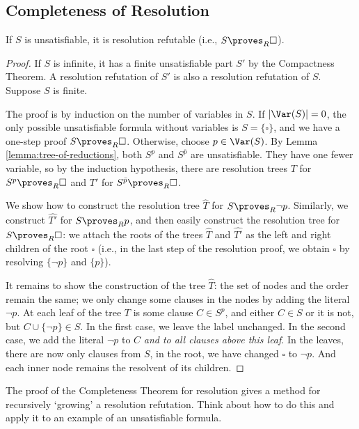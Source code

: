 \subsection{Completeness of Resolution}

\begin{theorem}
If $S$ is unsatisfiable, it is resolution refutable (i.e., $S \proves_R \square$).
\end{theorem}   
\begin{proof}
If $S$ is infinite, it has a finite unsatisfiable part $S'$ by the Compactness Theorem. A resolution refutation of $S'$ is also a resolution refutation of $S$. Suppose $S$ is finite.

The proof is by induction on the number of variables in $S$. If $|\Var(S)| = 0$, the only possible unsatisfiable formula without variables is $S = \{\square\}$, and we have a one-step proof $S \proves_R \square$. Otherwise, choose $p \in \Var(S)$. By Lemma \ref{lemma:tree-of-reductions}, both $S^p$ and $S^{\bar{p}}$ are unsatisfiable. They have one fewer variable, so by the induction hypothesis, there are resolution trees $T$ for $S^p \proves_R \square$ and $T'$ for $S^{\bar{p}} \proves_R \square$.

We show how to construct the resolution tree $\widehat{T}$ for $S \proves_R \neg p$. Similarly, we construct $\widehat{T'}$ for $S \proves_R p$, and then easily construct the resolution tree for $S \proves_R \square$: we attach the roots of the trees $\widehat{T}$ and $\widehat{T'}$ as the left and right children of the root $\square$ (i.e., in the last step of the resolution proof, we obtain $\square$ by resolving $\{\neg p\}$ and $\{p\}$).

It remains to show the construction of the tree $\widehat{T}$: the set of nodes and the order remain the same; we only change some clauses in the nodes by adding the literal $\neg p$. At each leaf of the tree $T$ is some clause $C \in S^p$, and either $C \in S$ or it is not, but $C \cup \{\neg p\} \in S$. In the first case, we leave the label unchanged. In the second case, we add the literal $\neg p$ to $C$ \emph{and to all clauses above this leaf}. In the leaves, there are now only clauses from $S$, in the root, we have changed $\square$ to $\neg p$. And each inner node remains the resolvent of its children.
\end{proof}

\begin{exercise}
    The proof of the Completeness Theorem for resolution gives a method for recursively `growing' a resolution refutation. Think about how to do this and apply it to an example of an unsatisfiable formula.
\end{exercise}


